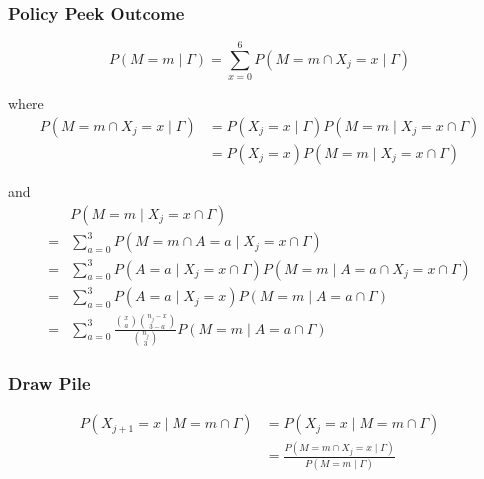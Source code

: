 \documentclass[fleqn, 12pt, letterpaper]{article}
\begin{document}
\subsubsection{Policy Peek Outcome}
\begin{equation*}
	P(M=m \mid \Gamma) = \sum_{x=0}^6 P(M=m \cap X_j=x \mid \Gamma) 
\end{equation*}

where
\begin{align*}
	P(M=m \cap X_j=x \mid \Gamma)
		&= P(X_j=x \mid \Gamma) P(M=m \mid X_j=x \cap \Gamma) \\
		&= P(X_j=x) P(M=m \mid X_j=x \cap \Gamma)
\end{align*}

and
\begin{align*}
	& P(M=m \mid X_j=x \cap \Gamma) \\
	={}& \sum_{a=0}^3 P(M=m \cap A=a \mid X_j=x \cap \Gamma) \\
	={}& \sum_{a=0}^3 P(A=a \mid X_j=x \cap \Gamma) P(M=m \mid A=a \cap X_j=x \cap \Gamma) \\
	={}& \sum_{a=0}^3 P(A=a \mid X_j=x) P(M=m \mid A=a \cap \Gamma) \\
	={}& \sum_{a=0}^3 \frac{\binom{x}{a} \binom{n_j-x}{3-a}}{\binom{n_j}{3}} P(M=m \mid A=a \cap \Gamma)
\end{align*}

\subsubsection{Draw Pile}
\begin{align*}
	P(X_{j+1}=x \mid M=m \cap \Gamma)
		&= P(X_j=x \mid M=m \cap \Gamma) \\
		&= \frac{P(M=m \cap X_j=x \mid \Gamma)}{P(M=m \mid \Gamma)}
\end{align*}
\end{document}
